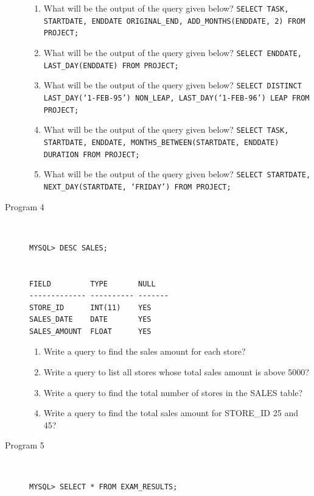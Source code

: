 \documentclass[11pt,a4paper]{article}
\def\AnswerBox{\fbox{\begin{minipage}{4in}\hfill\vspace{0.5in}\end{minipage}}}
\begin{document}
\begin{description}
\begin{enumerate}[label=\bfseries Q\arabic*:]\itemsep10pt
\item What will be the output of the query given below?\newline
\texttt{SELECT TASK, STARTDATE, ENDDATE ORIGINAL\_END, ADD\_MONTHS(ENDDATE, 2) FROM PROJECT;}
\item What will be the output of the query given below?\newline
\texttt{SELECT ENDDATE, LAST\_DAY(ENDDATE) FROM PROJECT;}
\item What will be the output of the query given below?\newline
\texttt{SELECT DISTINCT LAST\_DAY(`1-FEB-95') NON\_LEAP, LAST\_DAY(`1-FEB-96') LEAP FROM PROJECT;}
\item What will be the output of the query given below?\newline
\texttt{SELECT TASK, STARTDATE, ENDDATE, MONTHS\_BETWEEN(STARTDATE, ENDDATE) DURATION FROM PROJECT;}
\item What will be the output of the query given below?\newline
\texttt{SELECT STARTDATE, NEXT\_DAY(STARTDATE, `FRIDAY') FROM PROJECT;}
\end{enumerate}

\item[Program 4]\
\begin{verbatim}
MYSQL> DESC SALES;


FIELD         TYPE       NULL  
------------- ---------- -------
STORE_ID      INT(11)    YES
SALES_DATE    DATE       YES
SALES_AMOUNT  FLOAT      YES

\end{verbatim}


\begin{enumerate}[label=\bfseries Q\arabic*:]\itemsep10pt
\item Write a query to find the sales amount for each store?
\item Write a query to list all stores whose total sales amount is above 5000?
\item Write a query to find the total number of stores in the SALES table?
\item Write a query to find the total sales amount for STORE\_ID 25 and 45?
\end{enumerate}
\newpage
\item [Program 5]\ 
\begin{verbatim}
MYSQL> SELECT * FROM EXAM_RESULTS;


\end{verbatim}
\end{description}
\end{document}
